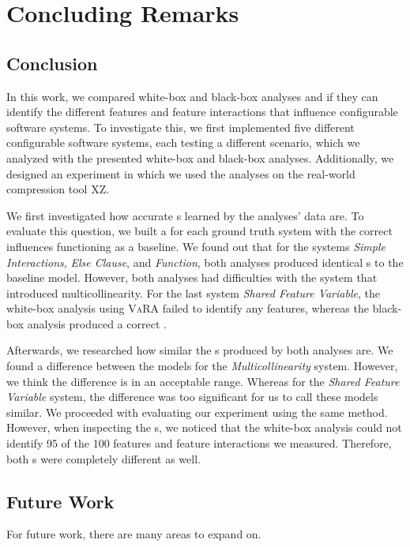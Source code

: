 \chapter{Concluding Remarks}\label{ch:conclusion}

\section{Conclusion}\label{sec:conclusion}
In this work, we compared white-box and black-box analyses and if they can identify the different features and feature interactions 
that influence configurable software systems. To investigate this, we first implemented five different configurable software systems,
each testing a different scenario, which we analyzed with the presented white-box and black-box analyses. Additionally, 
we designed an experiment in which we used the analyses on the real-world compression tool \textsc{XZ}.

We first investigated how accurate {\perfInfluenceModel}s learned by the analyses' data are. 
To evaluate this question, we built a {\perfInfluenceModel} for each ground truth system with the correct influences functioning as a baseline. 
We found out that for the systems \emph{Simple Interactions}, \emph{Else Clause}, and \emph{Function}, 
both analyses produced identical {\perfInfluenceModel}s to the baseline model. 
However, both analyses had difficulties with the system that introduced multicollinearity. 
For the last system \emph{Shared Feature Variable}, the white-box analysis using \textsc{VaRA} failed to identify any features, 
whereas the black-box analysis produced a correct {\perfInfluenceModel}.

Afterwards, we researched how similar the {\perfInfluenceModel}s produced by both analyses are. 
We found a difference between the models for the \emph{Multicollinearity} system. 
However, we think the difference is in an acceptable range. Whereas for the \emph{Shared Feature Variable} system, 
the difference was too significant for us to call these models similar. We proceeded with evaluating our experiment using the same method. 
However, when inspecting the {\perfInfluenceModel}s, we noticed that the white-box analysis could not identify 95 of the 100 features and 
feature interactions we measured. Therefore, both {\perfInfluenceModel}s were completely different as well.

\section{Future Work}\label{sec:futurework}
For future work, there are many areas to expand on. 


